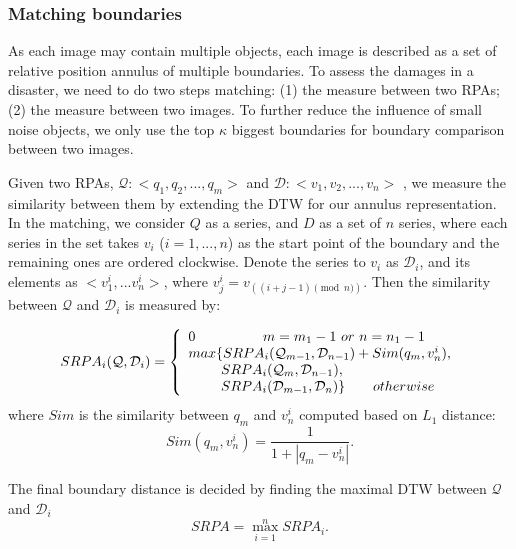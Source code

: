 \documentclass[runningheads,a4paper]{llncs}
\begin{document}
\subsubsection{Matching boundaries}
As each image may contain multiple objects, each image is described as a set of relative position annulus of multiple boundaries. 
To assess the damages in a disaster, we need to do two steps matching: 
(1) the measure between two RPAs; 
(2) the measure between two images. 
To further reduce the influence of small noise objects, we only use the top $\kappa$ biggest boundaries for boundary comparison between two images.

Given two RPAs, $\mathcal{Q}: <q_1, q_2,...,q_m>$ and $\mathcal{D}: <v_1,v_2,...,v_{n}>$ , we measure the similarity between them by extending the DTW \cite{Berndt:1994:UDT:3000850.3000887} for our annulus representation. In the matching, we consider $Q$ as a series, and $D$ as a set of $n$ series, where each series in the set takes $v_i$ ($i=1,...,n$) as the start point of the boundary and the remaining ones are ordered clockwise. Denote the series to $v_i$ as $\mathcal{D}_i$, and its elements as $<v_1^i,...v_n^i>$, where $v_j^i=v_{((i+j-1)\pmod n)}$. Then the similarity between $\mathcal{Q}$ and $\mathcal{D}_i$ is measured by:

\begin{equation}
\begin{array}{l}
SRPA_i(\mathcal{Q}, \mathcal{D}_i)= \left\{ \begin{array}{l}
 0 \hspace{1.7 cm}m=m_1-1~ or~ n=n_1-1 \\
max\{ SRPA_i(\mathcal{Q}_{m-1},\mathcal{D}_{n-1})+Sim(q_m,v_n^i),  \\
 ~~~~~~~SRPA_i(\mathcal{Q}_{m},\mathcal{D}_{n-1}), \\
 ~~~~~~~SRPA_i(\mathcal{D}_{m-1},\mathcal{D}_{n})\} \hspace{0.7cm} otherwise
 \end{array} \right.
 \end{array}
\label{SRPA}
\end{equation}
where $Sim$ is the similarity between $q_m$ and $v_n^i$ computed based on $L_1$ distance:
\begin{equation}\label{Sim}
  Sim(q_m,v_n^i)=\frac{1}{1+|q_m-v_n^i|}.
\end{equation}

\noindent The final boundary distance is decided by finding the maximal DTW between $\mathcal{Q}$ and $\mathcal{D}_i$
\begin{equation}\label{OverallSRPA}
  SRPA=\max_{i=1}^n SRPA_i.
\end{equation}
\end{document}
